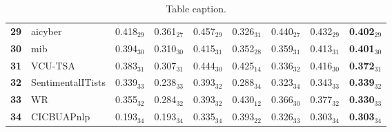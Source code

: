 \begin{table*}[tbh]
\begin{small}
\begin{tabular}{|c|l|ll|lll|l|l|}
\bf 29 & aicyber & 0.418$_{29}$ & 0.361$_{27}$ & 0.457$_{29}$ & 0.326$_{31}$ & 0.440$_{27}$ & 0.432$_{29}$ & \bf 0.402$_{29}$ \\
\bf 30 & mib & 0.394$_{30}$ & 0.310$_{30}$ & 0.415$_{31}$ & 0.352$_{28}$ & 0.359$_{31}$ & 0.413$_{31}$ & \bf 0.401$_{30}$ \\
\bf 31 & VCU-TSA & 0.383$_{31}$ & 0.307$_{31}$ & 0.444$_{30}$ & 0.425$_{14}$ & 0.336$_{32}$ & 0.416$_{30}$ & \bf 0.372$_{31}$ \\
\bf 32 & SentimentalITists & 0.339$_{33}$ & 0.238$_{33}$ & 0.393$_{32}$ & 0.288$_{34}$ & 0.323$_{34}$ & 0.343$_{33}$ & \bf 0.339$_{32}$ \\
\bf 33 & WR & 0.355$_{32}$ & 0.284$_{32}$ & 0.393$_{32}$ & 0.430$_{12}$ & 0.366$_{30}$ & 0.377$_{32}$ & \bf 0.330$_{33}$ \\
\bf 34 & CICBUAPnlp & 0.193$_{34}$ & 0.193$_{34}$ & 0.335$_{34}$ & 0.393$_{22}$ & 0.326$_{33}$ & 0.303$_{34}$ & \bf 0.303$_{34}$ \\
\hline
\end{tabular}
\caption{Table caption.}
\label{table:results}
\end{small}
\end{table*}
